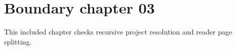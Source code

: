 \section{Boundary chapter 03}
\label{sec:boundary-03}
This included chapter checks recursive project resolution and reader page splitting.

